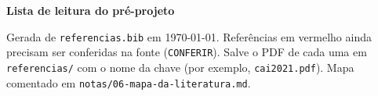 \documentclass[11pt,a4paper]{article}
\begin{document}
{\Large\bfseries\color{destaque} Lista de leitura do pré-projeto\par}
\smallskip
{\small Gerada de \texttt{referencias.bib} em \today. Referências em vermelho ainda precisam ser conferidas na fonte (\texttt{CONFERIR}). Salve o PDF de cada uma em \texttt{referencias/} com o nome da chave (por exemplo, \texttt{cai2021.pdf}). Mapa comentado em \texttt{notas/06-mapa-da-literatura.md}.\par}


\end{document}
